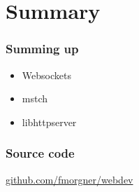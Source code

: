 \section{Summary}
\begin{frame}
  \frametitle{Summing up}
  \begin{itemize}
    \item Websockets
    \item mstch
    \item libhttpserver
  \end{itemize}
\end{frame}
\begin{frame}
  \frametitle{Source code}
  \begin{center}
    \href{https://github.com/fmorgner/webdev.git}{github.com/fmorgner/webdev}
  \end{center}
\end{frame}
